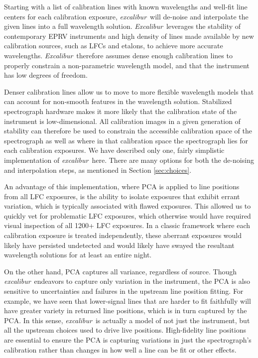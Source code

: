 \documentclass[modern]{aastex63}
\newcommand{\project}[1]{\textsl{#1}}
\newcommand{\name}{\project{excalibur}}
\newcommand{\Name}{\project{Excalibur}}
\begin{document}
Starting with a list of calibration lines with known wavelengths and well-fit line centers for each calibration exposure, \name\ will de-noise and interpolate the given lines into a full wavelength solution.  \Name\ leverages the stability of contemporary EPRV instruments and high density of lines made available by new calibration sources, such as LFCs and etalons, to achieve more accurate wavelengths.  \Name\ therefore assumes dense enough calibration lines to properly constrain a non-parametric wavelength model, and that the instrument has low degrees of freedom.

Denser calibration lines allow us to move to more flexible wavelength models that can account for non-smooth features in the wavelength solution.  Stabilized spectrograph hardware makes it more likely that the calibration state of the instrument is low-dimensional.  All calibration images in a given generation of stability can therefore be used to constrain the accessible calibration space of the spectrograph as well as where in that calibration space the spectrograph lies for each calibration exposures.  We have described only one, fairly simplistic implementation of \name\ here.  There are many options for both the de-noising and interpolation steps, as mentioned in Section \ref{sec:choices}.

An advantage of this implementation, where PCA is applied to line positions from all LFC exposures, is the ability to isolate exposures that exhibit errant variation, which is typically associated with flawed exposures.  This allowed us to quickly vet for problematic LFC exposures, which otherwise would have required visual inspection of all 1200+ LFC exposures.  In a classic framework where each calibration exposure is treated independently, these aberrant exposures would likely have persisted undetected and would likely have swayed the resultant wavelength solutions for at least an entire night.

On the other hand, PCA captures all variance, regardless of source.  Though \name\ endeavors to capture only variation in the instrument, the PCA is also sensitive to uncertainties and failures in the upstream line position fitting.  For example, we have seen that lower-signal lines that are harder to fit faithfully will have greater variety in returned line positions, which is in turn captured by the PCA.  In this sense, \name\ is actually a model of not just the instrument, but all the upstream choices used to drive live positions.  High-fidelity line positions are essential to ensure the PCA is capturing variations in just the spectrograph's calibration rather than changes in how well a line can be fit or other effects.
\end{document}
